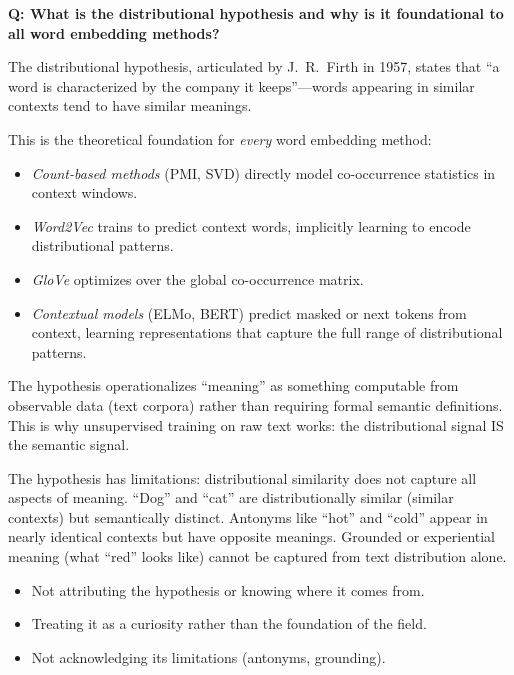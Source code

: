 \begin{interviewq}
\end{interviewq}

\vspace{0.5em}

\begin{interviewq}
\textbf{Q: What is the distributional hypothesis and why is it foundational
to all word embedding methods?}

 \quad {} \quad \badgefreq{\freqmed}

\stronganswer
The distributional hypothesis, articulated by J.~R.~Firth in 1957, states
that ``a word is characterized by the company it keeps''---words appearing in
similar contexts tend to have similar meanings.

This is the theoretical foundation for \emph{every} word embedding method:
\begin{itemize}
    \item \emph{Count-based methods} (PMI, SVD) directly model co-occurrence
    statistics in context windows.
    \item \emph{Word2Vec} trains to predict context words, implicitly
    learning to encode distributional patterns.
    \item \emph{GloVe} optimizes over the global co-occurrence matrix.
    \item \emph{Contextual models} (ELMo, BERT) predict masked or next tokens
    from context, learning representations that capture the full range of
    distributional patterns.
\end{itemize}

The hypothesis operationalizes ``meaning'' as something computable from
observable data (text corpora) rather than requiring formal semantic
definitions.  This is why unsupervised training on raw text works: the
distributional signal IS the semantic signal.

The hypothesis has limitations: distributional similarity does not capture all
aspects of meaning.  ``Dog'' and ``cat'' are distributionally similar
(similar contexts) but semantically distinct.  Antonyms like ``hot'' and
``cold'' appear in nearly identical contexts but have opposite meanings.
Grounded or experiential meaning (what ``red'' looks like) cannot be
captured from text distribution alone.

\redflags
\begin{itemize}
    \item Not attributing the hypothesis or knowing where it comes from.
    \item Treating it as a curiosity rather than the foundation of the field.
    \item Not acknowledging its limitations (antonyms, grounding).
\end{itemize}


\end{interviewq}
